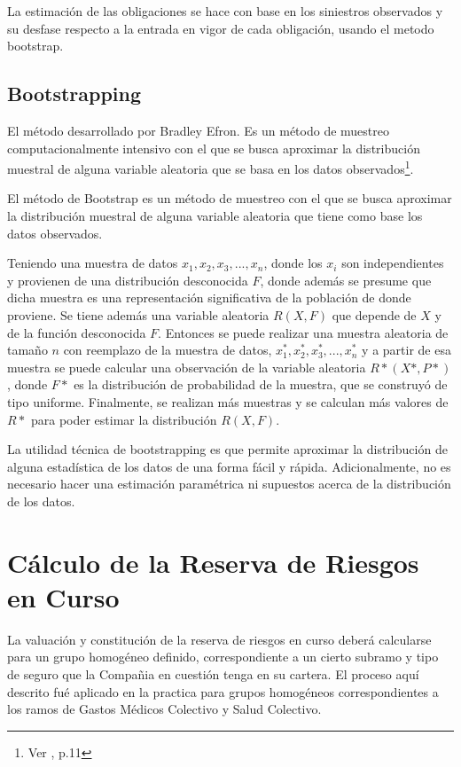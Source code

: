 \documentclass[11pt,twoside,openright,spanish]{report}
\numberwithin{equation}{chapter}
\numberwithin{figure}{chapter}
\numberwithin{table}{chapter}
\begin{document}
	La estimación de las obligaciones se hace con base en los siniestros observados y su desfase respecto a la entrada en vigor de cada obligación, usando el metodo bootstrap.
	
	\section{Bootstrapping}
	El método desarrollado por Bradley Efron. Es un método de muestreo computacionalmente intensivo con el que se busca aproximar la distribución muestral de alguna variable aleatoria que se basa en los datos observados\footnote{Ver \citet{MBootstrap}, p.11}.

	El método de Bootstrap es un método de muestreo con el que se busca aproximar la distribución muestral de alguna variable aleatoria que tiene como base los datos observados.

	Teniendo una muestra de datos $x_{1},x_{2},x_{3},...,x_{n}$, donde los $x_{i}$ son independientes y provienen de una distribución desconocida $F$, donde además se presume que dicha muestra es una representación significativa de la población de donde proviene. Se tiene además una variable aleatoria $R(X,F)$ que depende de $X$ y de la función desconocida $F$. Entonces se puede realizar una muestra aleatoria de tamaño $n$ con reemplazo de la muestra de datos, $x_{1}^{*},x_{2}^{*},x_{3}^{*},...,x_{n}^{*}$ y a partir de esa muestra se puede calcular una observación de la variable aleatoria $R*(X*,P*)$, donde $F*$ es la distribución de probabilidad de la muestra, que se construyó de tipo uniforme. Finalmente, se realizan más muestras y se calculan más valores de $R*$ para poder estimar la distribución $R(X,F)$.

	La utilidad técnica de bootstrapping es que permite aproximar la distribución de alguna estadística de los datos de una forma fácil y rápida. Adicionalmente, no es necesario hacer una estimación paramétrica ni supuestos acerca de la distribución de los datos.
	
	

	\chapter{Cálculo de la Reserva de Riesgos en Curso}\label{metnum}
	
	La valuación y constitución de la reserva de riesgos en curso deberá calcularse para un grupo homogéneo definido, correspondiente a un cierto subramo y tipo de seguro que la Compañia en cuestión tenga en su cartera. El proceso aquí descrito fué aplicado en la practica para grupos homogéneos correspondientes a los ramos de Gastos Médicos Colectivo y Salud Colectivo.
	
\end{document}
